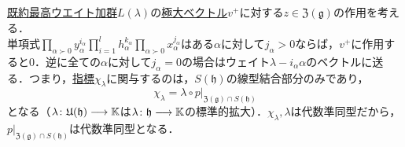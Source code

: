 \documentclass[rep_main]{subfiles}
\begin{document}
\hyperref[thm:hwmodule-exist]{既約最高ウエイト加群}$L(\lambda)$の\hyperref[def:maximal-vector-rep]{極大ベクトル}$v^+$に対する$z \in \mathfrak{Z}(\mathfrak{g})$の作用を考える．\\
単項式$\prod_{\alpha \succ 0}y_\alpha^{i_\alpha}\prod_{i = 1}^l h_\alpha^{k_\alpha}\prod_{\alpha \succ 0}x_\alpha^{j_\alpha}$はある$\alpha$に対して$j_\alpha > 0$ならば，$v^+$に作用すると$0$．逆に全ての$\alpha$に対して$j_\alpha = 0$の場合はウェイト$\lambda - i_\alpha\alpha$のベクトルに送る．つまり，\hyperref[def:character]{指標}$\chi_\lambda$に関与するのは，$S(\mathfrak{h})$の線型結合部分のみであり，
\begin{equation}
	\label{eq:Harish-Chandra-1}
	\chi_\lambda = \lambda \circ p|_{\mathfrak{Z}(\mathfrak{g}) \cap S(\mathfrak{h})}
\end{equation}
となる（$\lambda\colon \mathfrak{U}(\mathfrak{h}) \longrightarrow \mathbb{K}$は$\lambda\colon \mathfrak{h} \longrightarrow \mathbb{K}$の標準的拡大）．$\chi_\lambda, \lambda$は代数準同型だから，$p|_{\mathfrak{Z}(\mathfrak{g}) \cap S(\mathfrak{h})}$は代数準同型となる．
\end{document}
